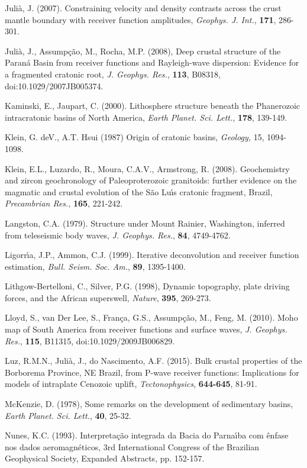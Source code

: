 \documentclass[manuscript,11pt]{geophysics}
\begin{document}
Juli\`a, J. (2007). Constraining velocity and density contrasts across the crust mantle boundary with receiver function amplitudes, \textit{Geophys. J. Int.}, \textbf{171}, 286-301.

Juli\`a, J., Assump\c{c}\~ao, M., Rocha, M.P. (2008), Deep crustal structure of the Paran\'a Basin from receiver functions and Rayleigh-wave dispersion: Evidence for a fragmented cratonic root, \textit{J. Geophys. Res.}, \textbf{113}, B08318, doi:10.1029/2007JB005374.

Kaminski, E., Jaupart, C. (2000). Lithosphere structure beneath the Phanerozoic intracratonic basins of North America, \textit{Earth Planet. Sci. Lett.}, \textbf{178}, 139-149.

Klein, G. deV.,  A.T. Hsui (1987) Origin of cratonic basins, \textit{Geology,} 15, 1094-1098.

Klein, E.L., Luzardo, R., Moura, C.A.V., Armstrong, R. (2008). Geochemistry and zircon geochronology of Paleoproterozoic granitoids: further evidence on the magmatic and crustal evolution of the S\~ao Lu\'{\i}s cratonic fragment, Brazil, \textit{Precambrian Res.}, \textbf{165}, 221-242.

Langston, C.A. (1979). Structure under Mount Rainier, Washington, inferred from teleseismic body waves, \textit{J. Geophys. Res.}, \textbf{84}, 4749-4762.

Ligorr\'{\i}a, J.P., Ammon, C.J. (1999). Iterative deconvolution and receiver function estimation, \textit{Bull. Seism. Soc. Am.}, \textbf{89}, 1395-1400.

Lithgow-Bertelloni, C.,  Silver, P.G. (1998), Dynamic topography, plate driving forces, and the African superswell, \textit{Nature}, \textbf{395}, 269-273.

Lloyd, S., van Der Lee, S., Fran\c{c}a, G.S., Assump\c{c}\~ao, M., Feng, M. (2010). Moho map of South America from receiver functions and surface waves, \textit{J. Geophys. Res.}, \textbf{115}, B11315, doi:10.1029/2009JB006829.

Luz, R.M.N., Juli\`a, J., do Nascimento, A.F. (2015). Bulk crustal properties of the Borborema Province, NE Brazil, from P-wave receiver functions: Implications for models of intraplate Cenozoic uplift, \textit{Tectonophysics}, \textbf{644-645}, 81-91.

McKenzie, D. (1978), Some remarks on the development of sedimentary basins, \textit{Earth Planet. Sci. Lett.}, \textbf{40}, 25-32.

Nunes, K.C. (1993). Interpreta\c{c}\~ao integrada da Bacia do Parna\'{\i}ba com \^enfase nos dados aeromagn\'eticos, 3rd International Congress of the Brazilian Geophysical Society, Expanded Abstracts, pp. 152-157.
\end{document}
